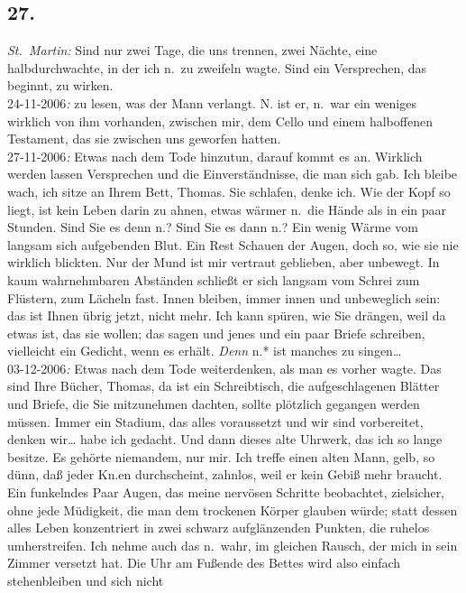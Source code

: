 \documentclass[
]{article}
\author{}
\date{\vspace{-2.5em}}
\begin{document}
\subsection{27.}\label{section}

\emph{St.~Martin: }Sind nur zwei Tage, die uns trennen, zwei Nächte,
eine halbdurchwachte, in der ich n.~zu zweifeln wagte. Sind ein
Versprechen, das beginnt, zu wirken.\\
24-11-2006\emph{: }zu lesen, was der Mann verlangt. N. ist er, n.~war
ein weniges wirklich von ihm vorhanden, zwischen mir, dem Cello und
einem halboffenen Testament, das sie zwischen uns geworfen hatten.\\
27-11-2006\emph{:} Etwas nach dem Tode hinzutun, darauf kommt es an.
Wirklich werden lassen Versprechen und die Einverständnisse, die man
sich gab. Ich bleibe wach, ich sitze an Ihrem Bett, Thomas. Sie
schlafen, denke ich. Wie der Kopf so liegt, ist kein Leben darin zu
ahnen, etwas wärmer n.~die Hände als in ein paar Stunden. Sind Sie es
denn n.? Sind Sie es dann n.? Ein wenig Wärme vom langsam sich
aufgebenden Blut. Ein Rest Schauen der Augen, doch so, wie sie nie
wirklich blickten. Nur der Mund ist mir vertraut geblieben, aber
unbewegt. In kaum wahrnehmbaren Abständen schließt er sich langsam vom
Schrei zum Flüstern, zum Lächeln fast. Innen bleiben, immer innen und
unbeweglich sein: das ist Ihnen übrig jetzt, nicht mehr. Ich kann
spüren, wie Sie drängen, weil da etwas ist, das sie wollen; das sagen
und jenes und ein paar Briefe schreiben, vielleicht ein Gedicht, wenn es
erhält. \emph{Denn }n.* ist manches zu singen\ldots*\\
03-12-2006\emph{: }Etwas nach dem Tode weiterdenken, als man es vorher
wagte. Das sind Ihre Bücher, Thomas, da ist ein Schreibtisch, die
aufgeschlagenen Blätter und Briefe, die Sie mitzunehmen dachten, sollte
plötzlich gegangen werden müssen. Immer ein Stadium, das alles
voraussetzt und wir sind vorbereitet, denken wir\ldots{} habe ich
gedacht. Und dann dieses alte Uhrwerk, das ich so lange besitze. Es
gehörte niemandem, nur mir. Ich treffe einen alten Mann, gelb, so dünn,
daß jeder Kn.en durchscheint, zahnlos, weil er kein Gebiß mehr braucht.
Ein funkelndes Paar Augen, das meine nervösen Schritte beobachtet,
zielsicher, ohne jede Müdigkeit, die man dem trockenen Körper glauben
würde; statt dessen alles Leben konzentriert in zwei schwarz
aufglänzenden Punkten, die ruhelos umherstreifen. Ich nehme auch das
n.~wahr, im gleichen Rausch, der mich in sein Zimmer versetzt hat. Die
Uhr am Fußende des Bettes wird also einfach stehenbleiben und sich nicht
\end{document}
